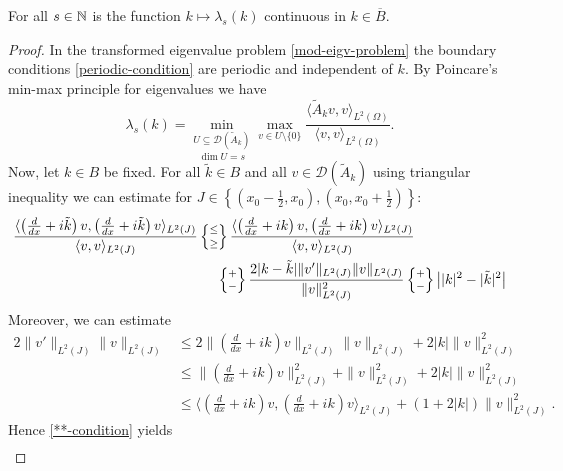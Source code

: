 \begin{theorem} \label{6.1}
	For all $s \in \mathbb{N}$ is the function $k \mapsto \lambda_{s}(k)$ continuous in $k \in \overline{B}$.
	\begin{proof}
		In the transformed eigenvalue problem \eqref{mod-eigv-problem} the boundary conditions \eqref{periodic-condition} are periodic and independent of $k$. By Poincare's min-max principle for eigenvalues we have
		\begin{equation}
			\lambda_{s}(k) = \underset{\dim U = s}{\min_{U \subseteq \mathcal{D}(\tilde{A}_{k})}} \max_{v \in U \setminus \{ 0 \} } \frac{\langle \tilde{A}_{k} v, v \rangle_{L^{2}(\Omega)}}{\langle v, v \rangle_{L^{2}(\Omega)}}.  \label{poincare} 
		\end{equation} 
		Now, let $k \in B$ be fixed. For all $\tilde{k} \in B$ and all $v \in \mathcal{D}(\tilde{A}_{k})$ using triangular inequality we can estimate for $J \in \left\{ (x_{0} - \frac{1}{2}, x_{0}), (x_{0}, x_{0} + \frac{1}{2}) \right\}$:
		\begin{align}
			 \frac{ \langle \left( \frac{d}{dx} + i\tilde{k} \right) v , \left( \frac{d}{dx} + i\tilde{k} \right) v \rangle_{L^{2}(J)}}{\langle v , v \rangle_{L^{2}(J)}} & \left\{\mathrel{\substack{\leq \\[0.1cm] \geq}}\right\} \frac{ \langle \left( \frac{d}{dx} + ik \right) v , \left( \frac{d}{dx} + ik \right) v \rangle_{L^{2}(J)}}{\langle v , v \rangle_{L^{2}(J)}} \notag \\
			& ~\quad \left\{\mathrel{\substack{+ \\[0.1cm] -}}\right\} \frac{2 |k-\tilde{k}|\|v'\|_{L^{2}(J)} \| v \|_{L^{2}(J)}}{\| v \|^{2}_{L^{2}(J)}} \left\{\mathrel{\substack{+ \\[0.1cm] -}}\right\} \left| |k|^{2} - |\tilde{k}|^{2} \right| \label{**-condition}
		\end{align}
		Moreover, we can estimate
		\begin{align*}
			2 \| v' \|_{L^{2}(J)} \| v \|_{L^{2}(J)} & \leq 2 \| \left( \frac{d}{dx} + ik \right) v\|_{L^{2}(J)} \| v \|_{L^{2}(J)} + 2|k| \|v\|^{2}_{L^{2}(J)} \\
			& \leq \| \left( \frac{d}{dx} + ik \right) v \|^{2}_{L^{2}(J)} + \| v \|^{2}_{L^{2}(J)} + 2 |k| \| v \|^{2}_{L^{2}(J)} \\
			& \leq \langle  \left( \frac{d}{dx} + ik \right) v,  \left( \frac{d}{dx} + ik \right) v \rangle_{L^{2}(J)} + (1 + 2|k|) \|v\|^{2}_{L^{2}(J)}.
		\end{align*}
		Hence \eqref{**-condition} yields
		\begin{align*}

\end{align*}
\end{proof}
\end{theorem}
